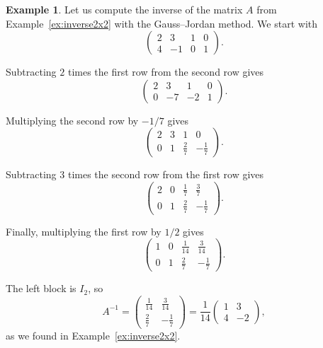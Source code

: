 \documentclass[11pt]{article}
\theoremstyle{definition}
\newtheorem{example}[definition]{Example}
\theoremstyle{plain}
\theoremstyle{remark}
\begin{document}
\begin{example}
    Let us compute the inverse of the matrix $A$ from Example~\ref{ex:inverse2x2} with the Gauss--Jordan method. We start with
    \[\left(\begin{array}{cc|cc}
        2 & 3 & 1 & 0 \\
        4 & -1 & 0 & 1
    \end{array}\right).\]

    Subtracting $2$ times the first row from the second row gives
    \[\left(\begin{array}{cc|cc}
        2 & 3 & 1 & 0 \\
        0 & -7 & -2 & 1
    \end{array}\right).\]

    Multiplying the second row by $-1/7$ gives
    \[\left(\begin{array}{cc|cc}
        2 & 3 & 1 & 0 \\
        0 & 1 & \frac{2}{7} & -\frac{1}{7}
    \end{array}\right).\]

    Subtracting $3$ times the second row from the first row gives
    \[\left(\begin{array}{cc|cc}
        2 & 0 & \frac{1}{7} & \frac{3}{7} \\
        0 & 1 & \frac{2}{7} & -\frac{1}{7}
    \end{array}\right).\]

    Finally, multiplying the first row by $1/2$ gives
    \[\left(\begin{array}{cc|cc}
        1 & 0 & \frac{1}{14} & \frac{3}{14} \\
        0 & 1 & \frac{2}{7} & -\frac{1}{7}
    \end{array}\right).\]

    The left block is $I_2$, so
    \[A^{-1} = \begin{pmatrix}
        \frac{1}{14} & \frac{3}{14} \\
        \frac{2}{7} & -\frac{1}{7}
    \end{pmatrix} = \frac{1}{14} \begin{pmatrix}
        1 & 3 \\
        4 & -2
    \end{pmatrix},\]
    as we found in Example~\ref{ex:inverse2x2}.
\end{example}
\end{document}

